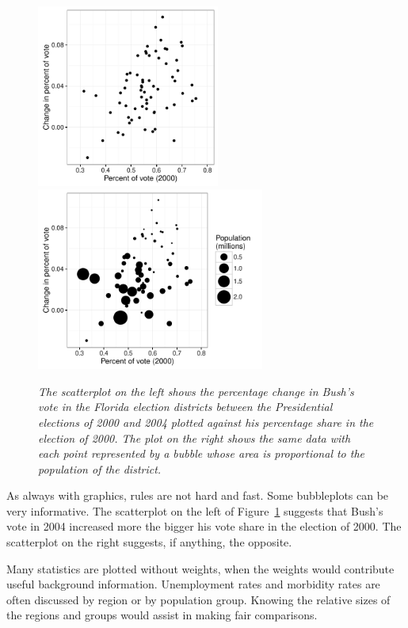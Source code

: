 \documentclass{svmult}
\begin{document}
\begin{figure}[htbp]
  \centering
  \includegraphics[height=6cm]{florida}%
  \includegraphics[height=6cm]{florida-weighted}
  \caption{\em The scatterplot on the left shows the percentage change in Bush's vote in the Florida election districts between the Presidential elections of 2000 and 2004 plotted against his percentage share in the election of 2000.  The plot on the right shows the same data with each point represented by a bubble whose area is proportional to the population of the district.}
  \label{bubflor}
\end{figure}
      
As always with graphics, rules are not hard and fast.  Some bubbleplots can be very informative.  The scatterplot on the left of Figure~\ref{bubflor} suggests that Bush's vote in 2004 increased more the bigger his vote share in the election of 2000.  The scatterplot on the right suggests, if anything, the opposite. 

Many statistics are plotted without weights, when the weights would contribute useful background information.  Unemployment rates and morbidity rates are often discussed by region or by population group.  Knowing the relative sizes of the regions and groups would assist in making fair comparisons.
\end{document}
